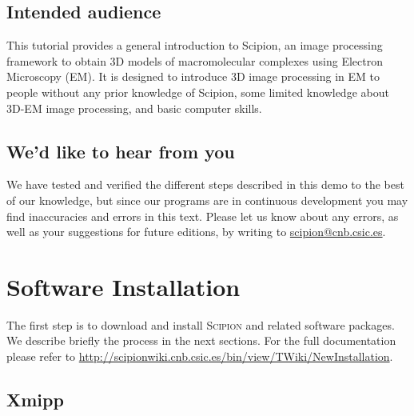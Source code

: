 \documentclass[12pt]{article} %
\newcommand{\scipion}{\textsc{Scipion} }
\begin{document}


\subsection*{Intended audience}

This tutorial provides a general introduction to Scipion, an image
processing framework to obtain 3D models of macromolecular complexes
using Electron Microscopy (EM). It is designed to introduce 3D image
processing in EM to people without any prior knowledge of Scipion,
some limited knowledge about 3D-EM image processing, and basic
computer skills.

\subsection*{We'd like to hear from you}

We have tested and verified the different steps described in this demo
to the best of our knowledge, but since our programs are in continuous
development you may find inaccuracies and errors in this text. Please
let us know about any errors, as well as your suggestions for
future editions, by writing to
\href{mailto:scipion@cnb.csic.es}{scipion@cnb.csic.es}.

\newpage



\tableofcontents %

\newpage %


\section{Software Installation}

The first step is to download %
and install \scipion and related software packages. We describe
briefly the process in the next sections. For the full documentation please refer to
\url{http://scipionwiki.cnb.csic.es/bin/view/TWiki/NewInstallation}.

\subsection{Xmipp}
\end{document}
